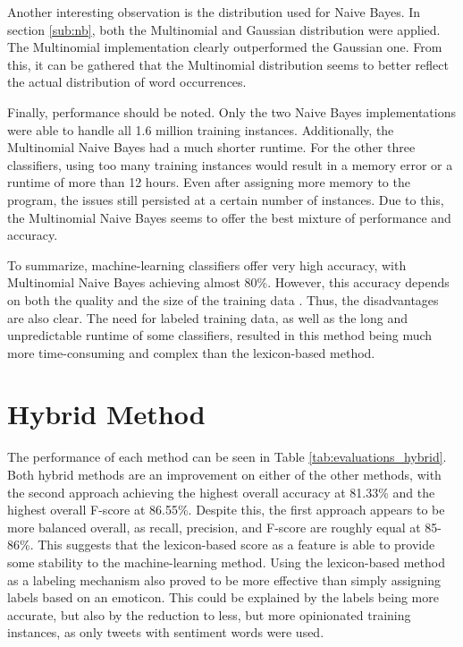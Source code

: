 Another interesting observation is the distribution used for Naive Bayes. In section \ref{sub:nb}, both the Multinomial and Gaussian distribution were applied. The Multinomial implementation clearly outperformed the Gaussian one. From this, it can be gathered that the Multinomial distribution seems to better reflect the actual distribution of word occurrences.

Finally, performance should be noted. Only the two Naive Bayes implementations were able to handle all 1.6 million training instances. Additionally, the Multinomial Naive Bayes had a much shorter runtime. For the other three classifiers, using too many training instances would result in a memory error or a runtime of more than 12 hours. Even after assigning more memory to the program, the issues still persisted at a certain number of instances. Due to this, the Multinomial Naive Bayes seems to offer the best mixture of performance and accuracy.

To summarize, machine-learning classifiers offer very high accuracy, with Multinomial Naive Bayes achieving almost 80\%. However, this accuracy depends on both the quality and the size of the training data \cite{DBLP:journals/csur/GiachanouC16}. Thus, the disadvantages are also clear. The need for labeled training data, as well as the long and unpredictable runtime of some classifiers, resulted in this method being much more time-consuming and complex than the lexicon-based method. 

\section{Hybrid Method}

The performance of each method can be seen in Table \ref{tab:evaluations_hybrid}. Both hybrid methods are an improvement on either of the other methods, with the second approach achieving the highest overall accuracy at 81.33\% and the highest overall F-score at 86.55\%. Despite this, the first approach appears to be more balanced overall, as recall, precision, and F-score are roughly equal at 85-86\%. This suggests that the lexicon-based score as a feature is able to provide some stability to the machine-learning method. Using the lexicon-based method as a labeling mechanism also proved to be more effective than simply assigning labels based on an emoticon. This could be explained by the labels being more accurate, but also by the reduction to less, but more opinionated training instances, as only tweets with sentiment words were used.

